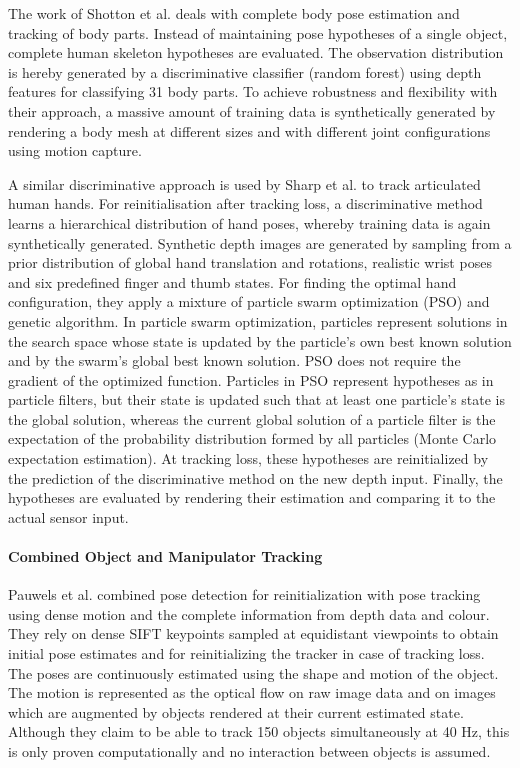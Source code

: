 The work of Shotton et al. \cite{Shotton2013} deals with complete body pose estimation and tracking of body parts. Instead of maintaining pose hypotheses of a single object, complete human skeleton hypotheses are evaluated. The observation distribution is hereby generated by a discriminative classifier (random forest) using depth features for classifying 31 body parts. To achieve robustness and flexibility with their approach, a massive amount of training data is synthetically generated by rendering a body mesh at different sizes and with different joint configurations using motion capture.

A similar discriminative approach is used by Sharp et al. \cite{Sharp2015} to track articulated human hands. For reinitialisation after tracking loss, a discriminative method learns a hierarchical distribution of hand poses, whereby training data is again synthetically generated. Synthetic depth images are generated by sampling from a prior distribution of global hand translation and rotations, realistic wrist poses and six predefined finger and thumb states.
For finding the optimal hand configuration, they apply a mixture of particle swarm optimization (PSO) and genetic algorithm. In particle swarm optimization, particles represent solutions in the search space whose state is updated by the particle's own best known solution and by the swarm's global best known solution. PSO does not require the gradient of the optimized function.
Particles in PSO represent hypotheses as in particle filters, but their state is updated such that at least one particle's state is the global solution, whereas the current global solution of a particle filter is the expectation of the probability distribution formed by all particles (Monte Carlo expectation estimation).
At tracking loss, these hypotheses are reinitialized by the prediction of the discriminative method on the new depth input. Finally, the hypotheses are evaluated by rendering their estimation and comparing it to the actual sensor input.

\paragraph{Combined Object and Manipulator Tracking}
Pauwels et al. \cite{Pauwels2015} combined pose detection for reinitialization with pose tracking using dense motion and the complete information from depth data and colour. They rely on dense SIFT keypoints sampled at equidistant viewpoints to obtain initial pose estimates and for reinitializing the tracker in case of tracking loss.
The poses are continuously estimated using the shape and motion of the object. The motion is represented as the optical flow on raw image data and on images which are augmented by objects rendered at their current estimated state.
Although they claim to be able to track 150 objects simultaneously at 40 Hz, this is only proven computationally and no interaction between objects is assumed.

